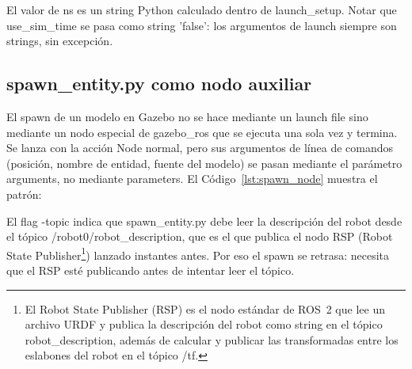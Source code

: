 El valor de ns es un string Python calculado dentro de launch\_setup. Notar que use\_sim\_time se pasa como string 'false': los argumentos de launch siempre son strings, sin excepción.

\subsection{spawn\_entity.py como nodo auxiliar}

El spawn de un modelo en Gazebo no se hace mediante un launch file sino mediante un nodo especial de gazebo\_ros que se ejecuta una sola vez y termina. Se lanza con la acción Node normal, pero sus argumentos de línea de comandos (posición, nombre de entidad, fuente del modelo) se pasan mediante el parámetro arguments, no mediante parameters. El Código~\ref{lst:spawn_node} muestra el patrón:



El flag -topic indica que spawn\_entity.py debe leer la descripción del robot desde el tópico /robot0/robot\_description, que es el que publica el nodo RSP (Robot State Publisher\footnote{El Robot State Publisher (RSP) es el nodo estándar de ROS~2 que lee un archivo URDF y publica la descripción del robot como string en el tópico robot\_description, además de calcular y publicar las transformadas entre los eslabones del robot en el tópico /tf.}) lanzado instantes antes. Por eso el spawn se retrasa: necesita que el RSP esté publicando antes de intentar leer el tópico.
